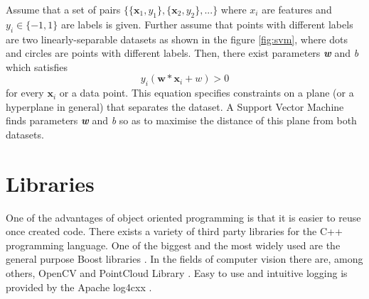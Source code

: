 	Assume that a set of pairs $\{\{\mathbf{x}_1, y_1\}, \{\mathbf{x}_2, y_2\}, ...\}$ where $x_\mathit{i}$ are features and $y_\mathit{i} \in \{-1, 1\}$ are labels is given. Further assume that points with different labels are two linearly-separable datasets as shown in the figure \ref{fig:svm}, where dots and circles are points with different labels. Then, there exist parameters \textbf{\textit{w}} and  \textit{b} which satisfies	
	\begin{equation}
	                        y_\mathit{i}\left(\mathbf{w}*\mathbf{x}_\mathit{i} + w\right) > 0                                                                                                                                                                                                                                                                                                                                                                                                                       
	                                                                                                                                                                                                                                                                                                                                                                                                                                               \end{equation}
	for every $\mathbf{x}_\mathit{i}$ or a data point. This equation specifies constraints on a plane (or a hyperplane in general) that separates the dataset. A Support Vector Machine finds parameters \textbf{\textit{w}} and  \textit{b} so as to maximise the distance of this plane from both datasets.
	
\section{Libraries}

	One of the advantages of object oriented programming is that it is easier to reuse once created code. There exists a variety of third party libraries for the C++ programming language. One of the biggest and the most widely used are the general purpose Boost libraries \cite{Boost}. In the fields of computer vision there are, among others, OpenCV \cite{OpenCV} and PointCloud Library \cite{PCL}. Easy to use and intuitive logging is provided by the Apache log4cxx \cite{log4cxx}.
	
